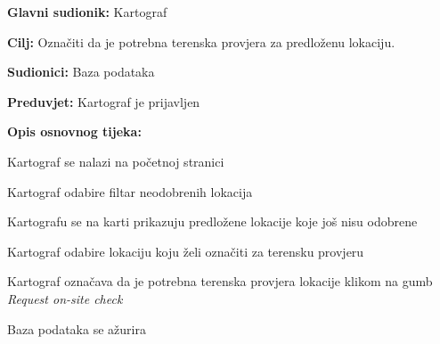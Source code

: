 					\noindent {}
					\begin{packed_item}
	
						\item \textbf{Glavni sudionik: }Kartograf
						\item  \textbf{Cilj:} Označiti da je potrebna terenska provjera za predloženu lokaciju.
						\item  \textbf{Sudionici:} Baza podataka
						\item  \textbf{Preduvjet:} Kartograf je prijavljen
						\item  \textbf{Opis osnovnog tijeka:}
						
						\item[] \begin{packed_enum}
	
							\item Kartograf se nalazi na početnoj stranici
							\item Kartograf odabire filtar neodobrenih lokacija
							\item Kartografu se na karti prikazuju predložene lokacije koje još nisu odobrene
							\item Kartograf odabire lokaciju koju želi označiti za terensku provjeru
							\item Kartograf označava da je potrebna terenska provjera lokacije klikom na gumb \textit{Request on-site check}
							\item Baza podataka se ažurira

						\end{packed_enum}
						
					\end{packed_item}
					
